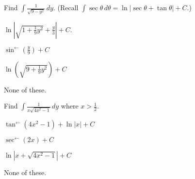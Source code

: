 \documentclass[12pt]{exam}
\newcommand{\<}{(}
\renewcommand{\>}{)}
\begin{document}
\begin{center}
\end{center}
\vspace{0.1in}

\vspace{12pt}

\begin{questions}\setcounter{question}{6}

\question
Find \(\int \frac{1}{\sqrt{9-y^2}}\,dy\).
(Recall \(\int\sec\theta\,d\theta=\ln|\sec\theta+\tan\theta|+C\).)
\begin{choices}
\item \(\ln|\sqrt{1+\frac{1}{9}y^2}+\frac{y}{3}|+C\).
\item \(\sin^{\leftarrow}(\frac{y}{9})+C\)
\item \(\ln(\sqrt{9+\frac{1}{9}y^2})+C\)
\item None of these.
\end{choices}

\question
Find \(\int \frac{1}{x\sqrt{4x^2-1}}\,dy\) where \(x>\frac{1}{2}\).
\begin{choices}
\item \(\tan^{\leftarrow}(4x^2-1)+\ln|x|+C\)
\item \(\sec^{\leftarrow}(2x)+C\)
\item \(\ln|x+\sqrt{4x^2-1}|+C\)
\item None of these.
\end{choices}



\end{questions}
\end{document}
